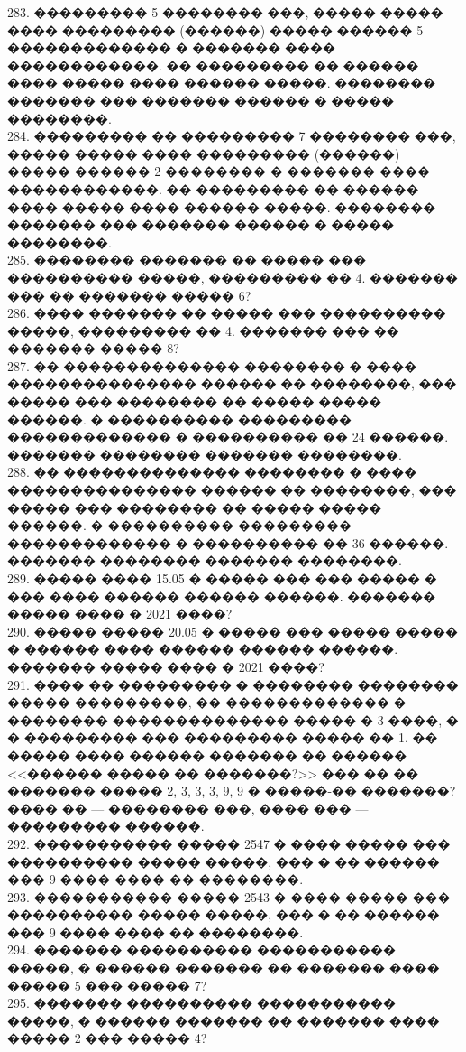 \documentclass[12pt]{article}
\begin{document}
283. ��������� 5 �������� ���, ����� ����� ���� ��������� (������) ����� ������ 5 ������������� � ������� ���� ������������. �� ��������� �� ������ ���� ����� ���� ������ �����. �������� ������� ��� ������� ������ � ����� ��������.\\
284. ��������� �� ��������� 7 �������� ���, ����� ����� ���� ��������� (������) ����� ������ 2 �������� � ������� ���� ������������. �� ��������� �� ������ ���� ����� ���� ������ �����. �������� ������� ��� ������� ������ � ����� ��������.\\
285. �������� ������� �� ����� ��� ���������� �����, ��������� �� 4. ������� ��� �� ������� ����� 6?\\
286. ���� ������� �� ����� ��� ���������� �����, ��������� �� 4. ������� ��� �� ������� ����� 8?\\
287. �� �������������� �������� � ���� ��������������� ������ �� ��������, ��� ����� ��� �������� �� ����� ����� ������. � ���������� ��������� ������������� � ���������� �� 24 ������. ������� �������� ������� ��������.\\
288. �� �������������� �������� � ���� ��������������� ������ �� ��������, ��� ����� ��� �������� �� ����� ����� ������. � ���������� ��������� ������������� � ���������� �� 36 ������. ������� �������� ������� ��������.\\
289. ����� ���� 15.05 � ����� ��� ��� ����� � ��� ���� ������ ������ ������. ������� ����� ���� � 2021 ����?\\
290. ����� ����� 20.05 � ����� ��� ����� ����� � ������ ���� ������ ������ ������. ������� ����� ���� � 2021 ����?\\
291. ���� �� ��������� � �������� �������� ����� ���������, �� ������������� � �������� �������������� ����� � 3 ����, � � ��������� ��� ��������� ����� �� 1. �� ����� ���� ������ ������� �� ������ <<������ ����� �� �������?>> ��� �� �� ������� ����� 2, 3, 3, 3, 9, 9 � �����-�� �������? ���� �� --- �������� ���, ���� ��� --- ��������� ������.\\
292. ����������� ����� 2547 � ���� ����� ��� ���������� ����� �����, ��� � �� ������ ��� 9 ���� ���� �� ��������.\\
293. ����������� ����� 2543 � ���� ����� ��� ���������� ����� �����, ��� � �� ������ ��� 9 ���� ���� �� ��������.\\
294. ������� ���������� ����������� �����, � ������ ������� �� ������� ���� ����� 5 ��� ����� 7?\\
295. ������� ���������� ����������� �����, � ������ ������� �� ������� ���� ����� 2 ��� ����� 4?\\
\end{document}
